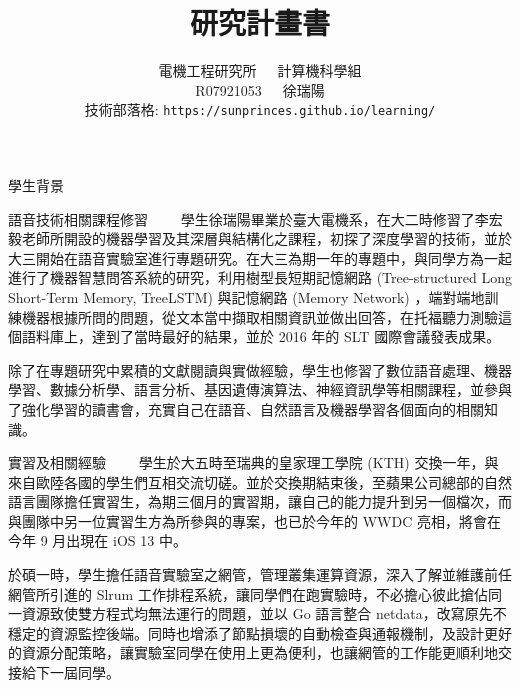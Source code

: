 \documentclass[12pt,UTF8,fntef]{article}
\title{研究計畫書}
\author{電機工程研究所~~~計算機科學組\\R07921053~~~徐瑞陽 \\ 技術部落格: \texttt{https://sunprinces.github.io/learning/}}
\date{}
\begin{document}
\maketitle

\begin{section}{學生背景}
  \begin{subsection}{語音技術相關課程修習}
~~~~學生徐瑞陽畢業於臺大電機系，在大二時修習了李宏毅老師所開設的機器學習及其深層與結構化之課程，初探了深度學習的技術，並於大三開始在語音實驗室進行專題研究。在大三為期一年的專題中，與同學方為一起進行了機器智慧問答系統的研究，利用樹型長短期記憶網路 (Tree-structured Long Short-Term Memory, TreeLSTM) 與記憶網路 (Memory Network) ，端對端地訓練機器根據所問的問題，從文本當中擷取相關資訊並做出回答，在托福聽力測驗這個語料庫上，達到了當時最好的結果，並於 2016 年的 SLT 國際會議發表成果。

    除了在專題研究中累積的文獻閱讀與實做經驗，學生也修習了數位語音處理、機器學習、數據分析學、語言分析、基因遺傳演算法、神經資訊學等相關課程，並參與了強化學習的讀書會，充實自己在語音、自然語言及機器學習各個面向的相關知識。
  \end{subsection}

  \begin{subsection}{實習及相關經驗}
    ~~~~學生於大五時至瑞典的皇家理工學院 (KTH) 交換一年，與來自歐陸各國的學生們互相交流切磋。並於交換期結束後，至蘋果公司總部的自然語言團隊擔任實習生，為期三個月的實習期，讓自己的能力提升到另一個檔次，而與團隊中另一位實習生方為所參與的專案，也已於今年的 WWDC 亮相，將會在今年 9 月出現在 iOS 13 中。

    於碩一時，學生擔任語音實驗室之網管，管理叢集運算資源，深入了解並維護前任網管所引進的 Slrum 工作排程系統，讓同學們在跑實驗時，不必擔心彼此搶佔同一資源致使雙方程式均無法運行的問題，並以 Go 語言整合 netdata，改寫原先不穩定的資源監控後端。同時也增添了節點損壞的自動檢查與通報機制，及設計更好的資源分配策略，讓實驗室同學在使用上更為便利，也讓網管的工作能更順利地交接給下一屆同學。
  \end{subsection}
\end{section}
\end{document}
